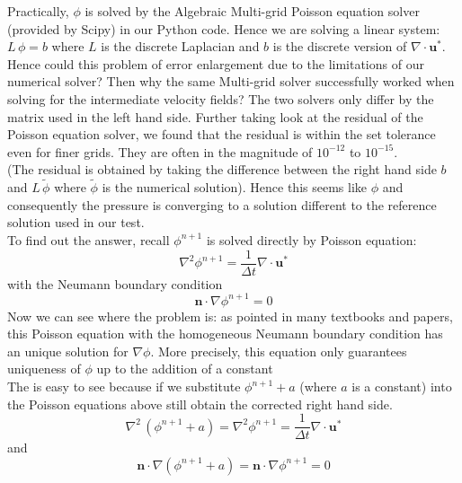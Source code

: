 Practically, $\phi$ is solved by the Algebraic Multi-grid Poisson equation solver (provided by Scipy) in our Python code. Hence we are solving a linear system: $L\,\phi = b$ where $L$ is the discrete Laplacian and $b$ is the discrete version of $\nabla \cdot \textbf{u}^*$. Hence could this problem of error enlargement due to the limitations of our numerical solver? Then why the same Multi-grid solver successfully worked when solving for the intermediate velocity fields? The two solvers only differ by the matrix used in the left hand side. Further taking look at the residual of the Poisson equation solver, we found that the residual is within the set tolerance even for finer grids. They are often in the magnitude of $10^{-12}$ to $10^{-15}$.\\
(The residual is obtained by taking the difference between the right hand side $b$ and $L\,\tilde{\phi}$ where $\tilde{\phi}$ is the numerical solution). Hence this seems like $\phi$ and consequently the pressure is converging to a solution different to the reference solution used in our test.\\

To find out the answer, recall $\phi^{n+1}$ is solved directly by Poisson equation:
\begin{equation*}
\nabla^2\phi^{n+1} = \dfrac{1}{\Delta t}\nabla \cdot \textbf{u}^*
\end{equation*}
with the Neumann boundary condition
\begin{equation*}
\textbf{n} \cdot \nabla \phi^{n+1} = 0
\end{equation*}
Now we can see where the problem is: as pointed in many textbooks and papers, this Poisson equation with the homogeneous Neumann boundary condition has an unique solution for $\nabla \phi$. More precisely, this equation only guarantees uniqueness of $\phi$ up to the addition of a constant \cite{chorin1990mathematical,maria2003application,brown2001accurate}\\
The is easy to see because if we substitute $\phi^{n+1} + a$ (where $a$ is a constant) into the Poisson equations above still obtain the corrected right hand side.
\begin{equation}
\nabla^2\,(\phi^{n+1} + a) = \nabla^2\phi^{n+1} = \dfrac{1}{\Delta t}\nabla \cdot \textbf{u}^*
\end{equation}
and 
\begin{equation}
\textbf{n} \cdot \nabla (\phi^{n+1} + a) = \textbf{n} \cdot \nabla \phi^{n+1} = 0
\end{equation}

